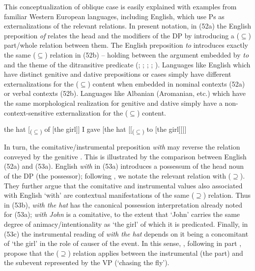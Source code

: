 \documentclass[output=paper]{langsci/langscibook}
\begin{document}
This conceptualization of oblique case is easily explained with examples from familiar Western European languages, including English, which use Ps as externalizations of the relevant relations. In present notation, in (52a) the English preposition \textit{of} relates the head and the modifiers of the DP by introducing a ($\subseteq$) part\slash whole relation between them. The English preposition \textit{to} introduces exactly the same ($\subseteq$) relation in (52b) – holding between the argument embedded by \textit{to} and the theme of the ditransitive predicate (\citealt{Kayne1984}; \citealt{Pesetsky1995}; \citealt{Harley2002Possession}; \citealt{Beck2004}; \citealt{Manzini2016}).  Languages like English which have distinct genitive and dative prepositions or cases simply have different externalizations for the ($\subseteq$) content when embedded in nominal contexts (52a) or verbal contexts (52b). Languages like Albanian (Aromanian, etc.) which have the same morphological realization for genitive and dative simply have a non-context-sensitive externalization for the ($\subseteq$) content.

\ea%
    \label{ex:manzini:52}
    \ea  the hat [\textsubscript{($\subseteq$)} of [the girl]]
    \ex  I gave [the hat [[\textsubscript{($\subseteq$)} to [the girl]]]]
    \z    
\z

In turn, the comitative\slash instrumental preposition \textit{with} may reverse the relation conveyed by the genitive \citep{Levinson2011}. This is illustrated by the comparison between English (52a) and (53a). English \textit{with} in (53a) introduces a possessum of the head noun of the DP (the possessor); following \citet{Franco2017}, we notate the relevant relation with ($\supseteq$). They further argue that the comitative and instrumental values also associated with English ‘with’ are contextual manifestations of the same ($\supseteq$) relation. Thus in (53b), \textit{with the hat} has the canonical possession interpretation already noted for (53a); \textit{with John} is a comitative, to the extent that ‘John’ carries the same degree of animacy\slash intentionality as ‘the girl’ of which it is predicated. Finally, in (53c) the instrumental reading of \textit{with the hat} depends on it being a concomitant of ‘the girl’ in the role of causer of the event. In this sense, \citet{Franco2017}, following in part \citet{Bruening2012}, propose that the ($\supseteq$) relation applies between the instrumental (the part) and the subevent represented by the VP (‘chasing the fly’).
\end{document}
